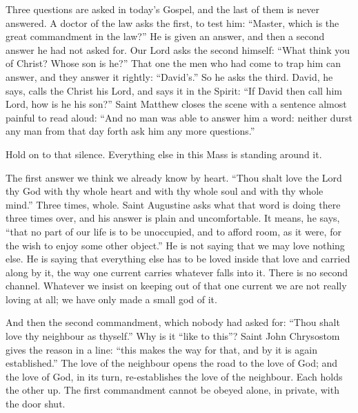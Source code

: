 
Three questions are asked in today's Gospel, and the last of them is never
answered. A doctor of the law asks the first, to test him: ``Master, which is
the great commandment in the law?'' He is given an answer, and then a second
answer he had not asked for. Our Lord asks the second himself: ``What think
you of Christ? Whose son is he?'' That one the men who had come to trap him
can answer, and they answer it rightly: ``David's.'' So he asks the third.
David, he says, calls the Christ his Lord, and says it in the Spirit: ``If
David then call him Lord, how is he his son?'' Saint Matthew closes the scene
with a sentence almost painful to read aloud: ``And no man was able to answer
him a word: neither durst any man from that day forth ask him any more
questions.''

Hold on to that silence. Everything else in this Mass is standing around it.

\bigskip

The first answer we think we already know by heart. ``Thou shalt love the
Lord thy God with thy whole heart and with thy whole soul and with thy whole
mind.'' Three times, whole. Saint Augustine asks what that word is doing
there three times over, and his answer is plain and uncomfortable. It means,
he says, ``that no part of our life is to be unoccupied, and to afford room,
as it were, for the wish to enjoy some other object.'' He is not saying that
we may love nothing else. He is saying that everything else has to be loved
inside that love and carried along by it, the way one current carries
whatever falls into it. There is no second channel. Whatever we insist on
keeping out of that one current we are not really loving at all; we have only
made a small god of it.

And then the second commandment, which nobody had asked for: ``Thou shalt
love thy neighbour as thyself.'' Why is it ``like to this''? Saint John
Chrysostom gives the reason in a line: ``this makes the way for that, and by
it is again established.'' The love of the neighbour opens the road to the
love of God; and the love of God, in its turn, re-establishes the love of the
neighbour. Each holds the other up. The first commandment cannot be
obeyed alone, in private, with the door shut.

